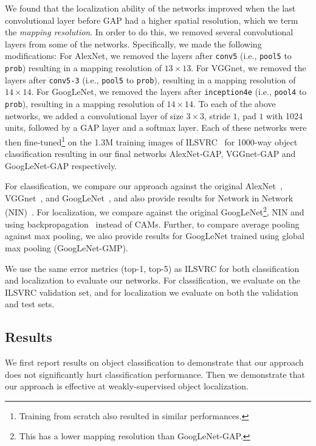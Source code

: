 \documentclass[10pt,twocolumn,letterpaper]{article}
\begin{document}
We found that the localization ability of the networks improved when the last convolutional layer before GAP had a higher spatial resolution, which we term the \textit{mapping resolution}. In order to do this, we removed several convolutional layers from some of the networks. Specifically, we made the following modifications: For AlexNet, we removed the layers after \texttt{conv5}
(i.e., \texttt{pool5} to \texttt{prob}) resulting in a mapping resolution of $13 \times 13$. For VGGnet, we removed the layers after \texttt{conv5-3} (i.e., \texttt{pool5} to \texttt{prob}), resulting in a mapping resolution of $14 \times 14$. For GoogLeNet, we removed the layers after \texttt{inception4e} (i.e., \texttt{pool4} to \texttt{prob}), resulting in a mapping resolution of $14 \times 14$. To each of the above networks, we added a convolutional layer of size $3\times3$, stride $1$, pad $1$ with 1024 units, followed by a GAP layer and a softmax layer. Each of these networks were then fine-tuned\footnote{Training from scratch also resulted in similar performances.} on the 1.3M training images of ILSVRC~\cite{ILSVRCijcv15} for 1000-way object classification resulting in our final networks AlexNet-GAP, VGGnet-GAP and GoogLeNet-GAP respectively.

For classification, we compare our approach against the original AlexNet~\cite{krizhevsky2012imagenet}, VGGnet~\cite{simonyan2014very}, and GoogLeNet~\cite{szegedy2014going}, and also provide results for Network in Network (NIN)~\cite{lin2013network}. For localization, we compare against the original GoogLeNet\footnote{This has a lower mapping resolution than GoogLeNet-GAP.}, NIN and using backpropagation~\cite{simonyan2013deep} instead of CAMs. Further, to compare average pooling against max pooling, we also provide results for GoogLeNet trained using global max pooling (GoogLeNet-GMP).

We use the same error metrics (top-1, top-5) as ILSVRC for both classification and localization to evaluate our networks. For classification, we evaluate on the ILSVRC validation set, and for localization we evaluate on both the validation and test sets. 






\subsection{Results}
\label{sec:locresults}
We first report results on object classification to demonstrate that our approach does not significantly hurt classification performance. Then we demonstrate that our approach is effective at weakly-supervised object localization.
\end{document}
